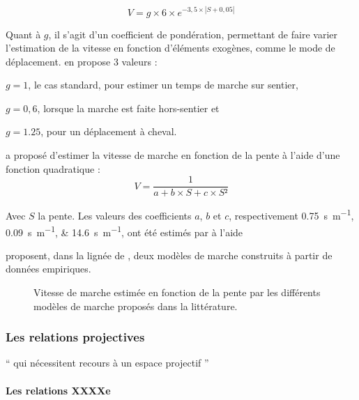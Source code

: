 \begin{equation}
  \label{eq:marche_tobler}
  V = g × 6 × e^{-3,5 × \left| S + 0,05 \right|}
\end{equation}

Quant à \(g\), il s'agit d'un coefficient de
pondération, permettant de faire varier l'estimation de la vitesse en
fonction d'éléments exogènes, comme le mode de
déplacement. \textcite{Tobler1993} en propose 3 valeurs :
%
\begin{enumerate*}[label=(\alph*)]
\item \(g = 1\), le cas standard, pour estimer un temps de marche sur
  sentier,
\item \(g = 0,6\), lorsque la marche est faite hors-sentier et
\item  \(g = 1.25\), pour un déplacement à cheval.
\end{enumerate*}

\textcite{Rees2004} a proposé d'estimer la vitesse de marche en
fonction de la pente à l'aide d'une fonction quadratique :
\begin{equation}
  V = \dfrac{1}{a + b × S + c × S²}
\end{equation}

Avec \(S\) la pente. Les valeurs des coefficients \(a\), \(b\) et
\(c\), respectivement \SIlist{0,75;0,09;14,6}{\second\per\meter}, ont
été estimés par \textcite{Rees2004} à l'aide

\textcite{Irmischer2017,Kerouanton2020} proposent, dans la lignée de
\textcite{Tobler1993}, deux modèles de marche construits à partir de
données empiriques.



\begin{figure}
  \centering
  \caption{Vitesse de marche estimée en fonction de la pente par les
    différents modèles de marche proposés dans la littérature.}
  \label{fig:modeles_marche}
\end{figure}


\subsubsection{Les relations projectives}

\enquote{\textelp{} qui nécessitent recours à un espace projectif
  \textelp{}} \autocite[p. 18]{Duchene2019}

\paragraph{Les relations XXXXe}

